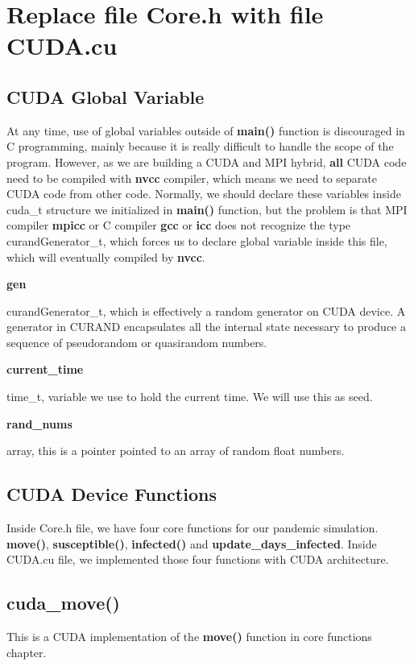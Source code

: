 \documentclass[letterpaper,10pt,openany,oneside]{sphinxmanual}
\begin{document}
\section{Replace file Core.h with file CUDA.cu}
\label{9-Cuda/cuda:replace-file-core-h-with-file-cuda-cu}

\subsection{CUDA Global Variable}
\label{9-Cuda/cuda:cuda-global-variable}
At any time, use of global variables outside of \textbf{main()} function is discouraged in C programming, mainly because it is really difficult to handle the scope of the program. However, as we are building a CUDA and MPI hybrid, \textbf{all} CUDA code need to be compiled with \textbf{nvcc} compiler, which means we need to separate CUDA code from other code. Normally, we should declare these variables inside cuda\_t structure we initialized in \textbf{main()} function, but the problem is that MPI compiler \textbf{mpicc} or C compiler \textbf{gcc} or \textbf{icc} does not recognize the type curandGenerator\_t, which forces us to declare global variable inside this file, which will eventually compiled by \textbf{nvcc}.

\textbf{gen}

curandGenerator\_t, which is effectively a random generator on CUDA device. A generator in CURAND encapsulates all the internal state necessary to produce a sequence of pseudorandom or quasirandom numbers.

\textbf{current\_time}

time\_t, variable we use to hold the current time. We will use this as seed.

\textbf{rand\_nums}

array, this is a pointer pointed to an array of random float numbers.


\subsection{CUDA Device Functions}
\label{9-Cuda/cuda:cuda-device-functions}
Inside Core.h file, we have four core functions for our pandemic simulation. \textbf{move()}, \textbf{susceptible()}, \textbf{infected()} and \textbf{update\_days\_infected}. Inside CUDA.cu file, we implemented those four functions with CUDA architecture.


\subsection{cuda\_move()}
\label{9-Cuda/cuda:cuda-move}
This is a CUDA implementation of the \textbf{move()} function in core functions chapter.
\end{document}
